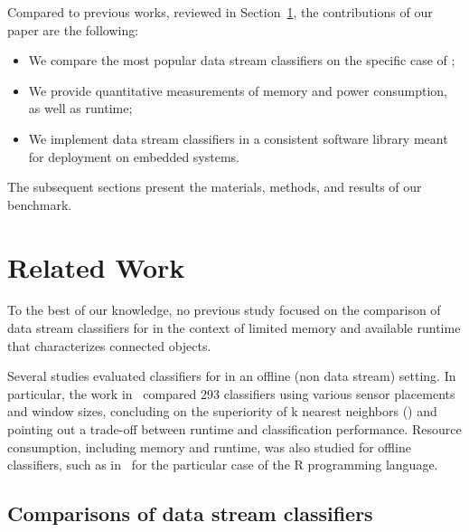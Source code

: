 Compared to previous works, reviewed in Section~\ref{sec:related-work}, the contributions of our paper are the following:
\begin{itemize}
    \item We compare the most popular data stream classifiers on the specific case of \har;
    \item We provide quantitative measurements of memory and power consumption, as well as runtime;
    \item We implement data stream classifiers in a consistent software library meant for deployment on embedded systems.
\end{itemize} 
The subsequent sections present the materials, methods, and results of our benchmark.


\section{Related Work}

\label{sec:related-work}

To the best of our knowledge, no previous study focused on the comparison
of data stream classifiers for \har in the context of limited memory and
available runtime that characterizes connected objects.

Several studies evaluated classifiers for \har in an offline (non data stream)
setting. In particular, the work in~\cite{Janidarmian_2017} compared 293
classifiers using various sensor placements and window sizes, concluding on the
superiority of k nearest neighbors (\knn) and pointing out a trade-off between
runtime and classification performance. Resource consumption, including memory
and runtime, was also studied for offline classifiers, such as
in~\cite{memory_consumption_machine_learning} for the particular case of the R
programming language.

\subsection{Comparisons of data stream classifiers}

